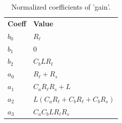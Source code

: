 \begin{table}[h]
\centering
\begin{tabular}[c]{ll}
\textbf{Coeff} & \textbf{Value} \\ 
\rowcolor{myyellow}
$b_{0}$ &$R_{\ell}$ \\ 
$b_{1}$ &$0$ \\ 
\rowcolor{myyellow}
$b_{2}$ &$C_{b} L R_{\ell}$ \\ 
$a_{0}$ &$R_{\ell} + R_{s}$ \\ 
\rowcolor{myyellow}
$a_{1}$ &$C_{a} R_{\ell} R_{s} + L$ \\ 
$a_{2}$ &$L \left(C_{a} R_{\ell} + C_{b} R_{\ell} + C_{b} R_{s}\right)$ \\ 
\rowcolor{myyellow}
$a_{3}$ &$C_{a} C_{b} L R_{\ell} R_{s}$ \\ 
\end{tabular}
\caption{Normalized coefficients of 'gain'.}
\end{table}


